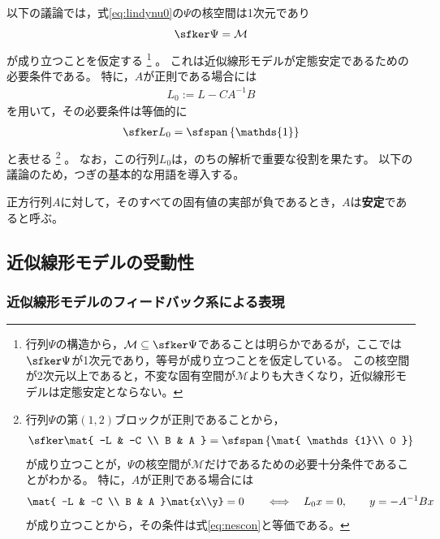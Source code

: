 \documentclass[tombow,dvipdfmx]{corona-a5-1.1}
\begin{document}
以下の議論では，式\ref{eq:lindynu0}の$\Psi$の核空間は1次元であり
\[
\sfker \Psi = \mathcal{M}
\]
が成り立つことを仮定する
\footnote{
行列$\Psi$の構造から，$\mathcal{M} \subseteq \sfker \Psi $であることは明らかであるが，ここでは$\sfker \Psi$が1次元であり，等号が成り立つことを仮定している。
この核空間が2次元以上であると，不変な固有空間が$\mathcal{M}$よりも大きくなり，近似線形モデルは定態安定とならない。
}
。
これは近似線形モデルが定態安定であるための必要条件である。
特に，$A$が正則である場合には
\begin{align}\label{eq:defL0}
L_0:= L-CA^{-1}B 
\end{align}
を用いて，その必要条件は等価的に
\begin{align}\label{eq:nescon}
\sfker L_0 = \sfspan
\left\{
\mathds{1}
\right\}
\end{align}
と表せる
\footnote{
行列$\Psi$の第$(1,2)$ブロックが正則であることから，
\begin{align*}%
\sfker \mat{
-L & -C \\
B & A
}
= \sfspan
\left\{
\mat{
\mathds{1}\\
0
}
\right\}
\end{align*}
が成り立つことが，$\Psi$の核空間が$\mathcal{M}$だけであるための必要十分条件であることがわかる。
特に，$A$が正則である場合には
\begin{align*}
\mat{
-L & -C \\
B & A
}\mat{x\\y}
=0
\qquad
\Longleftrightarrow
\quad
L_0 x=0,
\qquad
y=-A^{-1}Bx
\end{align*}
が成り立つことから，その条件は式\ref{eq:nescon}と等価である。
}
。
なお，この行列$L_0$は，のちの解析で重要な役割を果たす。
以下の議論のため，つぎの基本的な用語を導入する。

\begin{定義}[正方行列の安定性]
\label{def:matsta}
正方行列$A$に対して，そのすべての固有値の実部が負であるとき，$A$は\textbf{安定}であると呼ぶ。
\end{定義}



\subsection{近似線形モデルの受動性\advanced}\label{sec:linpasana}

\smallskip
\subsubsection{近似線形モデルのフィードバック系による表現}
\end{document}
